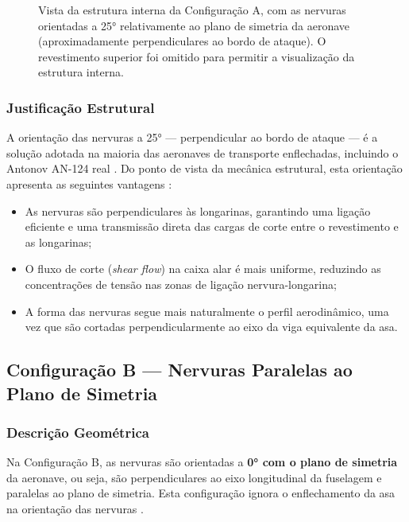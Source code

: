\documentclass[a4paper,fleqn,noprintline]{cas-dc}
\begin{document}
\begin{figure}[h!]
    \centering
    \caption{Vista da estrutura interna da Configuração A, com as nervuras orientadas a 25° relativamente ao plano de simetria da aeronave (aproximadamente perpendiculares ao bordo de ataque). O revestimento superior foi omitido para permitir a visualização da estrutura interna.}\label{fig:config_a}
\end{figure}

\subsubsection{Justificação Estrutural}

A orientação das nervuras a 25° --- perpendicular ao bordo de ataque --- é a solução adotada na maioria das aeronaves de transporte enflechadas, incluindo o Antonov AN-124 real \cite{Gordon2008, GarciaFernandez2025}. Do ponto de vista da mecânica estrutural, esta orientação apresenta as seguintes vantagens \cite{Niu1988, Megson2012}:

\begin{itemize}
    \item As nervuras são perpendiculares às longarinas, garantindo uma ligação eficiente e uma transmissão direta das cargas de corte entre o revestimento e as longarinas;
    \item O fluxo de corte (\textit{shear flow}) na caixa alar é mais uniforme, reduzindo as concentrações de tensão nas zonas de ligação nervura-longarina;
    \item A forma das nervuras segue mais naturalmente o perfil aerodinâmico, uma vez que são cortadas perpendicularmente ao eixo da viga equivalente da asa.
\end{itemize}

\subsection{Configuração B --- Nervuras Paralelas ao Plano de Simetria}

\subsubsection{Descrição Geométrica}

Na Configuração B, as nervuras são orientadas a \textbf{0° com o plano de simetria} da aeronave, ou seja, são perpendiculares ao eixo longitudinal da fuselagem e paralelas ao plano de simetria. Esta configuração ignora o enflechamento da asa na orientação das nervuras \cite{Raymer2018}.
\end{document}
